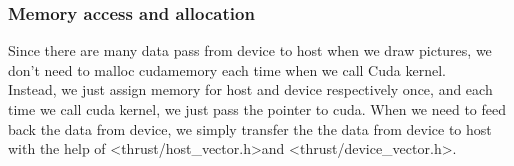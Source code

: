 \documentclass{article}
\begin{document}
        \subsubsection{Memory access and allocation}
            Since there are many data pass from device to host when we draw pictures, we don't need to malloc 
            cudamemory each time when we call Cuda kernel.\\
            Instead, we just assign memory for host and device respectively once, and each time we call cuda kernel, 
            we just pass the pointer to cuda. When we need to feed back the data from device, we simply transfer the 
            the data from device to host with the help of \textless thrust/host\_vector.h\textgreater and \textless thrust/device\_vector.h\textgreater.\\
            
\end{document}
